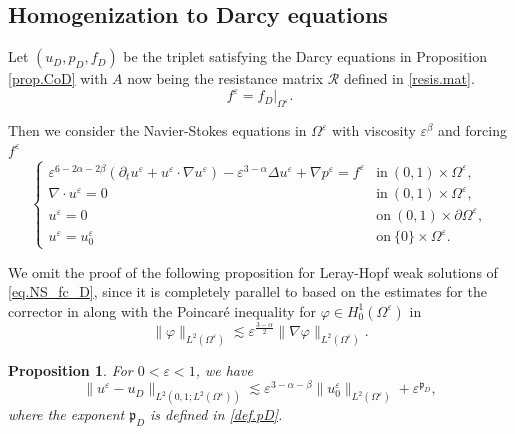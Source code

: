 \documentclass[11pt,a4paper]{article}
\numberwithin{equation}{section}
\newtheorem{proposition}[theorem]{Proposition}
{\theorembodyfont{\rmfamily}\newtheorem{remark}[theorem]{Remark}}
{\theorembodyfont{\rmfamily}\newtheorem{remarks}[theorem]{Remarks}}
\newcommand{\eps}{\varepsilon}
\begin{document}
    \subsection{Homogenization to Darcy equations}
    \label{sec.Homogenization.D}


Let $(u_D, p_D, f_D)$ be the triplet satisfying the Darcy equations in Proposition \ref{prop.CoD} 
 with $A$ now being the resistance matrix $\mathcal{R}$ defined in \eqref{resis.mat}.
\[
    f^\eps = f_D|_{\Omega^\eps}.
\]


Then we consider the Navier-Stokes equations in $\Omega^{\eps}$ with viscosity $\eps^\beta$ and forcing $f^\eps$ 
\begin{equation}\label{eq.NS_fc_D}
    \left\{
    \begin{array}{ll}
    \eps^{6-2\alpha-2\beta}
    (\partial_t u^\eps + u^\eps\cdot\nabla u^\eps)
    - \eps^{3-\alpha}\Delta u^\eps + \nabla p^\eps
    = f^\eps &\mbox{in}\ (0,1)\times \Omega^\eps,\\
    \nabla\cdot u^\eps = 0 &\mbox{in}\ (0,1)\times\Omega^\eps,\\
    u^\eps = 0 &\mbox{on}\ (0,1)\times\partial\Omega^\eps,\\
    u^\eps = u^\eps_0 &\mbox{on}\ \{0\}\times\Omega^\eps. 
    \end{array}
    \right.
\end{equation}


We omit the proof of the following proposition for Leray-Hopf weak solutions of \eqref{eq.NS_fc_D},  since it is completely parallel to \cite[Theorem 1.3]{Hof23} based on the estimates for the corrector in \cite[Section 2]{Hof23} along with the Poincaré inequality for $\varphi\in H^1_0(\Omega^\eps)$ in \cite[Lemma 3.4.1]{All90b} 
\begin{equation}\label{est.Poincare}
    \|\varphi\|_{L^2(\Omega^\eps)} \lesssim \eps^{\frac{3-\alpha}{2}} \|\nabla \varphi\|_{L^2(\Omega^\eps)}.
\end{equation} 


\begin{proposition}\label{prop.RoC.D}
For $0<\eps<1$, we have 
\begin{equation}\label{est1.prop.RoC.D}
    \|u^\eps-u_D\|_{L^2(0,1;L^2(\Omega^\eps))}
    \lesssim 
    \eps^{3-\alpha-\beta} \|u^\eps_0\|_{L^2(\Omega^\eps)} 
    + \eps^{\mathfrak p_D}, 
\end{equation}
where the exponent $\mathfrak p_D$ is defined in \eqref{def.pD}.
\end{proposition}
\end{document}
